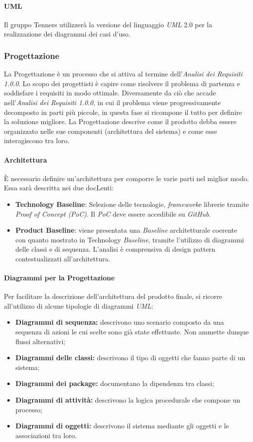 \paragraph{UML\glo}
Il gruppo Tenners utilizzerà la versione del linguaggio \textit{UML\glo} 2.0 per la realizzazione dei diagrammi dei casi d'uso.
\subsubsection{Progettazione}
La Progettazione è un processo che si attiva al termine dell'\textit{Analisi dei Requisiti 1.0.0\docs}. Lo scopo dei progettisti è capire come risolvere il problema di partenza e soddisfare i requisiti in modo ottimale. Diversamente da ciò che accade nell'\textit{Analisi dei Requisiti 1.0.0\docs}, in cui il problema viene progressivamente decomposto in parti più piccole, in questa fase si ricompone il tutto per definire la soluzione migliore. La Progettazione descrive come il prodotto debba essere organizzato nelle sue componenti (architettura del sistema) e come esse interagiscono tra loro.
\paragraph{Architettura}
È necessario definire un'architettura per comporre le varie parti nel miglior modo. Essa sarà descritta nei due docLenti:
\begin{itemize}
  \item \textbf{Technology Baseline\glos}: Selezione delle tecnologie, \textit{framework}\glo e librerie tramite \textit{Proof of Concept (PoC)\glos}. Il \textit{PoC\glo} deve essere accedibile su \textit{GitHub\glos}.
  \item \textbf{Product Baseline}: viene presentata una \textit{Baseline\glo} architetturale coerente con quanto mostrato in Technology \textit{Baseline\glos}, tramite l'utilizzo di diagrammi delle classi e di sequenza. L'analisi è comprensiva di design pattern contestualizzati all'architettura.
\end{itemize}
\paragraph{Diagrammi per la Progettazione}
Per facilitare la descrizione dell'architettura del prodotto finale, si ricorre all'utilizzo di alcune tipologie di diagrammi \textit{UML\glos}:
\begin{itemize}
	\item \textbf{Diagrammi di sequenza:} descrivono uno scenario composto da una sequenza di azioni le cui scelte sono già state effettuate. Non ammette dunque flussi alternativi;
	\item \textbf{Diagrammi delle classi:} descrivono il tipo di oggetti che fanno parte di un sistema;
	\item \textbf{Diagrammi dei package:} documentano la dipendenza tra classi;
	\item \textbf{Diagrammi di attività:} descrivono la logica procedurale che compone un processo;
	\item \textbf{Diagrammi di oggetti:} descrivono il sistema mediante gli oggetti e le associazioni tra loro.
\end{itemize}
